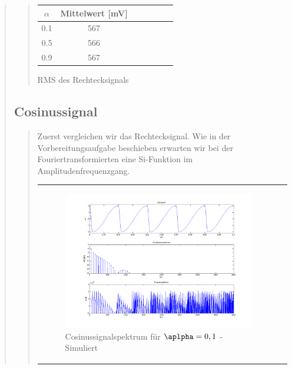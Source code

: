 \begin{quote}
\begin{quote}
                     
            \hspace{-4em}
                  \begin{tabular}{|c|c|c|c|c|c|c|}
                  \hline
                   $\alpha $ &  Mittelwert [mV] \\ \hline 
                   0.1 &  567 \\ \hline
                   0.5 &  566 \\ \hline
                   0.9 &  567 \\ \hline           
                 \end{tabular}
                       \caption{RMS des Rechtecksignals}
                        \label{tablelabel1}
        
    \end{quote}
    
    \subsection{Cosinussignal}
    \begin{quote}
        Zuerst vergleichen wir das Rechtecksignal. Wie in der Vorbereitungsaufgabe beschieben erwarten wir bei der
        Fouriertransformierten eine Si-Funktion im Amplitudenfrequenzgang.
        
            \begin{center}
            \begin{tabular}{ll}
            
            \hspace{-12em}
                \begin{minipage}{0.6\textwidth}
                    
                    \begin{figure}[H]
                        \label{fig:}            
                        \includegraphics[scale=0.25]{./Bilder/cos_alpha1.png} %
                        \caption{Cosinussignalspektrum für $\aplpha = 0,1$ - Simuliert}
                    \end{figure}
                    

\end{minipage}
\end{tabular}
\end{center}
\end{quote}
\end{quote}
